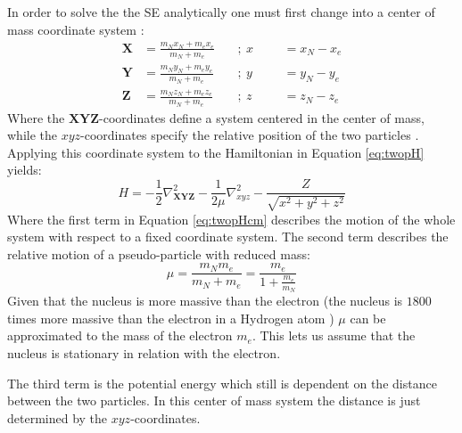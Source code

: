 \documentclass[../master_thesis.tex]{subfiles}
\begin{document}
In order to solve the the \ac{SE} analytically one must first change into a
center of mass coordinate system :
\begin{equation}
  \begin{aligned} \label{eq:cmparam}
    \mathbf{X} &= \frac{m_Nx_N + m_ex_e}{m_N + m_e} ~&&;~ x &&&= x_N - x_e \\
    \mathbf{Y} &= \frac{m_Ny_N + m_ey_e}{m_N + m_e} ~&&;~ y &&&= y_N - y_e \\
    \mathbf{Z} &= \frac{m_Nz_N + m_ez_e}{m_N + m_e} ~&&;~ z &&&= z_N - z_e
  \end{aligned}
\end{equation}
Where the $\mathbf{XYZ}$-coordinates define a system centered in the center of mass,
while the $xyz$-coordinates specify the relative position of the two particles
\cite{Jensen:2017}. Applying this coordinate system to the Hamiltonian in
Equation \ref{eq:twopH} yields:
\begin{equation}
  H = -\frac{1}{2}\nabla^2_{\mathbf{XYZ}} -\frac{1}{2\mu}\nabla^2_{xyz} -
  \frac{Z}{\sqrt{x^2 + y^2 + z^2}}\label{eq:twopHcm}
\end{equation}
Where the first term in Equation \ref{eq:twopHcm} describes the motion of the
whole system with respect to a fixed coordinate system. The second term
describes the relative motion of a pseudo-particle with reduced mass:
\begin{equation}
  \mu = \frac{m_Nm_e}{m_N + m_e} = \frac{m_e}{1 + \frac{m_e}{m_N}}
\end{equation}
Given that the nucleus is more massive than the electron (the nucleus is $1800$
times more massive than the electron in a Hydrogen atom \cite{Jensen:2017})
$\mu$ can be approximated to the mass of the electron $m_e$. This lets us
assume that the nucleus is stationary in relation with the electron.

The third term is the potential energy which still is dependent on the distance
between the two particles. In this center of mass system the distance is just
determined by the $xyz$-coordinates.
\end{document}

